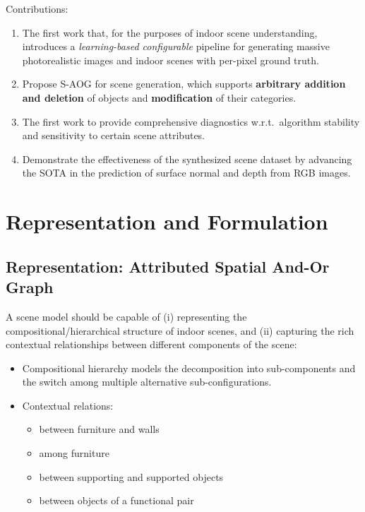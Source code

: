\documentclass[10pt]{article}
\begin{document}
Contributions:
%
\begin{enumerate}
  \item The first work that, for the purposes of indoor scene understanding,
    introduces a \textit{learning-based configurable} pipeline for generating
    massive photorealistic images and indoor scenes with per-pixel ground truth.
  \item Propose S-AOG for scene generation, which supports \textbf{arbitrary
    addition and deletion} of objects and \textbf{modification} of their
    categories.
  \item The first work to provide comprehensive diagnostics w.r.t.\ algorithm
    stability and sensitivity to certain scene attributes.
  \item Demonstrate the effectiveness of the synthesized scene dataset by
    advancing the SOTA in the prediction of surface normal and depth from RGB
    images.
\end{enumerate}


\section{Representation and Formulation}%
\label{sec:representation_and_formulation}
\subsection{Representation: Attributed Spatial And-Or Graph}%
\label{sec:representation}
A scene model should be capable of (i) representing the
compositional/hierarchical structure of indoor scenes, and (ii) capturing the
rich contextual relationships between different components of the scene:
%
\begin{itemize}
  \item Compositional hierarchy models the decomposition into sub-components
    and the switch among multiple alternative sub-configurations.
  \item Contextual relations:
    \begin{itemize}
      \item between furniture and walls
      \item among furniture
      \item between supporting and supported objects
      \item between objects of a functional pair
    \end{itemize}
\end{itemize}
\end{document}
